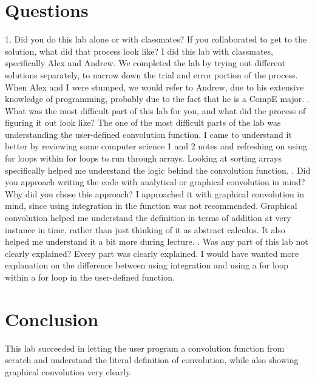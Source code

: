 \documentclass[12pt]{article}
\begin{document}
\section{Questions}
1. Did you do this lab alone or with classmates? If you collaborated to get to the solution, what did that process
look like?
\newline
I did this lab with classmates, specifically Alex and Andrew. We completed the lab by trying out different solutions separately, to narrow down the trial and error portion of the process. When Alex and I were stumped, we would refer to Andrew, due to his extensive knowledge of programming, probably due to the fact that he is a CompE major. 
. What was the most difficult part of this lab for you, and what did the process of figuring it out look like?
\newline
The one of the most difficult parts of the lab was understanding the user-defined convolution function. I came to understand it better by reviewing some computer science 1 and 2 notes and refreshing on using for loops within for loops to run through arrays. Looking at sorting arrays specifically helped me understand the logic behind the convolution function.
. Did you approach writing the code with analytical or graphical convolution in mind? Why did you chose this
approach?
\newline
I approached it with graphical convolution in mind, since using integration in the function was not recommended. Graphical convolution helped me understand the definition in terms of addition at very instance in time, rather than just thinking of it as abstract calculus. It also helped me understand it a bit more during lecture.
. Was any part of this lab not clearly explained?
\newline
Every part was clearly explained. I would have wanted more explanation on the difference between using integration and using a for loop within a for loop in the user-defined function.


\section{Conclusion}
This lab succeeded in letting the user program a convolution function from scratch and understand the literal definition of convolution, while also showing graphical convolution very clearly.
\end{document}
